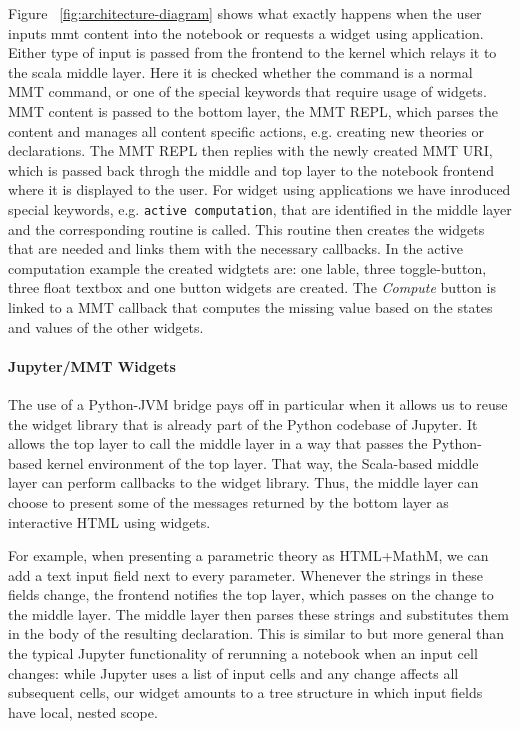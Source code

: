Figure ~\ref{fig:architecture-diagram} shows what exactly happens when the user inputs mmt content into the notebook or requests a widget using application.  
Either type of input is passed from the frontend to the kernel which relays it to the scala middle layer. Here it is checked whether the command is a normal MMT command, or one of the special keywords that require usage of widgets. MMT content is passed to the bottom layer, the MMT REPL, which parses the content and manages all content specific actions, e.g. creating new theories or declarations. The MMT REPL then replies with the newly created MMT URI, which is passed back throgh the middle and top layer to the notebook frontend where it is displayed to the user.
For widget using applications we have inroduced special keywords, e.g. \texttt{active computation}, that are identified in the middle layer and the corresponding routine is called. This routine then creates the widgets that are needed and links them with the necessary callbacks. In the active computation example the created widgtets are: one lable, three toggle-button, three float textbox and one button widgets are created. The \textit{Compute} button is linked to a MMT callback that computes the missing value based on the states and values of the other widgets.


\paragraph{Jupyter/MMT Widgets}
The use of a Python-JVM bridge pays off in particular when it allows us to reuse the widget library that is already part of the Python codebase of Jupyter.
It allows the top layer to call the middle layer in a way that passes the Python-based kernel environment of the top layer.
That way, the Scala-based middle layer can perform callbacks to the widget library.
Thus, the middle layer can choose to present some of the messages returned by the bottom layer as interactive HTML using widgets.

For example, when presenting a parametric theory as HTML+MathM, we can add a text input field next to every parameter.
Whenever the strings in these fields change, the frontend notifies the top layer, which passes on the change to the middle layer.
The middle layer then parses these strings and substitutes them in the body of the resulting declaration.
This is similar to but more general than the typical Jupyter functionality of rerunning a notebook when an input cell changes: while Jupyter uses a list of input cells and any change affects all subsequent cells, our widget amounts to a tree structure in which input fields have local, nested scope.

